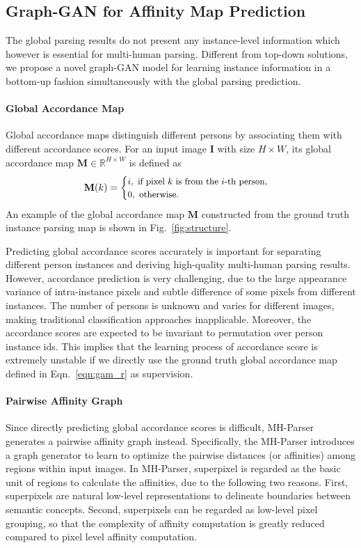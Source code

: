 \documentclass[10pt, letterpaper]{article}
\begin{document}
\subsection{Graph-GAN for Affinity Map Prediction}
The global parsing results do not present any instance-level information which however is essential for multi-human parsing. Different from top-down solutions, we propose a novel graph-GAN model for learning instance information in a bottom-up fashion simultaneously with the global parsing prediction.

\paragraph{Global Accordance Map}
Global accordance maps distinguish different persons by associating them with different accordance scores. For an input image $\mathbf{I}$ with size $H \times W$, its global accordance map $\mathbf{M} \in \mathbb{R}^{H \times W} $ is defined as 
\begin{equation}\label{eqn:gam_r}
\small
\mathbf{M}(k)=
\begin{cases}
i,  \text{ if pixel $k$ is from the $i$-th person},  \\
0,  \text{ otherwise}. \\
\end{cases}
\end{equation}
An example of the global accordance map $\mathbf{M}$ constructed from the ground truth instance parsing map is shown in Fig.~\ref{fig:structure}. 

Predicting global accordance scores accurately is important for separating different person instances and deriving high-quality multi-human parsing results.  However, accordance prediction is very challenging, due to the large appearance variance of  intra-instance pixels and subtle difference of some pixels from different instances. The number of persons is unknown and varies for different images, making traditional classification approaches inapplicable. Moreover, the accordance scores are expected to be invariant to permutation over person instance ids. This implies that the learning process of accordance score is extremely unstable if we directly use the ground truth global accordance map defined in Eqn.~\eqref{eqn:gam_r} as supervision. 

\paragraph{Pairwise Affinity Graph}
Since directly predicting global accordance scores is difficult, MH-Parser generates a pairwise affinity graph instead. Specifically, the MH-Parser introduces a graph generator to learn to optimize the pairwise distances (or affinities) among regions within input images. In MH-Parser, superpixel is regarded as the basic unit of regions to calculate the affinities, due to the following two reasons. First, superpixels are natural low-level representations to delineate boundaries between semantic concepts. Second, superpixels can be regarded as low-level pixel grouping, so that the complexity of affinity computation is greatly reduced compared to pixel level affinity computation.
\end{document}
